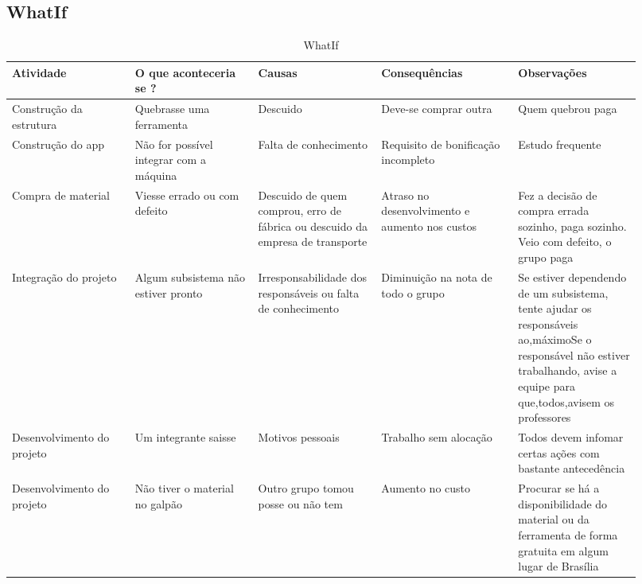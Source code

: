 \begin{apendicesenv}
\subsection{WhatIf}
\begin{table}[htp]
    \centering
    \caption{WhatIf}
    \label{my-label}
    \begin{tabular}{|p{0.18\linewidth}|p{0.18\linewidth}|p{0.18\linewidth}|p{0.20\linewidth}|p{0.18\linewidth}|}
    \hline
    \textbf{Atividade} & \textbf{O que aconteceria se ?} & \textbf{Causas} & \textbf{Consequências} & \textbf{Observações} \\ \hline
    Construção da estrutura & Quebrasse uma ferramenta & Descuido & Deve-se comprar outra & Quem quebrou paga \\ \hline
    Construção do app & Não for possível integrar com a máquina & Falta de conhecimento & Requisito de bonificação incompleto & Estudo frequente \\ \hline
    Compra de material & Viesse errado ou com defeito & Descuido de quem comprou, erro de fábrica ou descuido da empresa de transporte & Atraso no desenvolvimento e aumento nos custos & Fez a decisão de compra errada sozinho, paga sozinho. Veio com defeito, o grupo paga \\ \hline
    Integração do projeto & Algum subsistema não estiver pronto & Irresponsabilidade dos responsáveis ou falta de conhecimento & Diminuição na nota de todo o grupo & Se estiver dependendo de um subsistema, tente ajudar os responsáveis ao,máximoSe o responsável não estiver trabalhando, avise a equipe para que,todos,avisem os professores \\ \hline
    Desenvolvimento do projeto & Um integrante saisse & Motivos pessoais & Trabalho sem alocação & Todos devem infomar certas ações com bastante antecedência \\ \hline
    Desenvolvimento do projeto & Não tiver o material no galpão & Outro grupo tomou posse ou não tem & Aumento no custo & Procurar se há a disponibilidade do material ou da ferramenta de forma gratuita em algum lugar de Brasília \\ \hline
    \end{tabular}
\end{table}


\end{apendicesenv}
